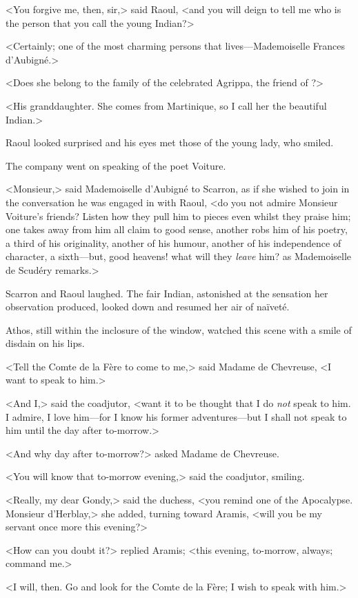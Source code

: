 <You forgive me, then, sir,> said Raoul, <and you will deign to tell me who is the person that you call the young Indian?>

<Certainly; one of the most charming persons that lives—Mademoiselle Frances d'Aubigné.>

<Does she belong to the family of the celebrated Agrippa, the friend of ?>

<His granddaughter. She comes from Martinique, so I call her the beautiful Indian.>

Raoul looked surprised and his eyes met those of the young lady, who smiled.

The company went on speaking of the poet Voiture.

<Monsieur,> said Mademoiselle d'Aubigné to Scarron, as if she wished to join in the conversation he was engaged in with Raoul, <do you not admire Monsieur Voiture's friends? Listen how they pull him to pieces even whilst they praise him; one takes away from him all claim to good sense, another robs him of his poetry, a third of his originality, another of his humour, another of his independence of character, a sixth—but, good heavens! what will they \emph{leave} him? as Mademoiselle de Scudéry remarks.>

Scarron and Raoul laughed. The fair Indian, astonished at the sensation her observation produced, looked down and resumed her air of naïveté.

Athos, still within the inclosure of the window, watched this scene with a smile of disdain on his lips.

<Tell the Comte de la Fère to come to me,> said Madame de Chevreuse, <I want to speak to him.>

<And I,> said the coadjutor, <want it to be thought that I do \emph{not} speak to him. I admire, I love him—for I know his former adventures—but I shall not speak to him until the day after to-morrow.>

<And why day after to-morrow?> asked Madame de Chevreuse.

<You will know that to-morrow evening,> said the coadjutor, smiling.

<Really, my dear Gondy,> said the duchess, <you remind one of the Apocalypse. Monsieur d'Herblay,> she added, turning toward Aramis, <will you be my servant once more this evening?>

<How can you doubt it?> replied Aramis; <this evening, to-morrow, always; command me.>

<I will, then. Go and look for the Comte de la Fère; I wish to speak with him.>

